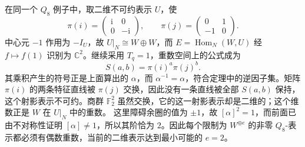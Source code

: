 \ProseParagraphBreak
在同一个 \(Q_8\) 例子中，取二维不可约表示 \(U\)，使
\[
	\pi(i)=\begin{pmatrix}\mathrm i&0\\0&-\mathrm i\end{pmatrix},
	\qquad
	\pi(j)=\begin{pmatrix}0&1\\-1&0\end{pmatrix}.
\]
中心元 \(-1\) 作用为 \(-I_U\)，故 \(U|_N\cong W\oplus W\)，而 \(E=\operatorname{Hom}_N(W,U)\) 经 \(f\mapsto f(1)\) 识别为 \(\mathbb C^2\)。继续采用 \(T_q=1\)，重数空间上的公式成为
\[
	S(a,b)=\pi(i)^a\pi(j)^b.
\]
其乘积产生的符号正是上面算出的 \(\alpha\)，而 \(\alpha^{-1}=\alpha\)，符合定理中的逆因子集。矩阵 \(\pi(i)\) 的两条特征直线被 \(\pi(j)\) 交换，因此没有一条直线被全部 \(S(a,b)\) 保持，这个射影表示不可约。商群 \(\mathbb F_2^2\) 虽然交换，它的这一射影表示却是二维的；这个维数正是 \(W\) 在 \(U|_N\) 中的重数。 这里障碍余圈的值为 \(\pm1\)，故 \([\alpha]^2=1\)，而前面已由不对称性证明 \([\alpha]\ne1\)，所以其阶恰为 \(2\)。因此每个限制为 \(W^{\oplus e}\) 的非零 \(Q_8\)-表示都必须有偶数重数，当前的二维表示达到最小可能的 \(e=2\)。
